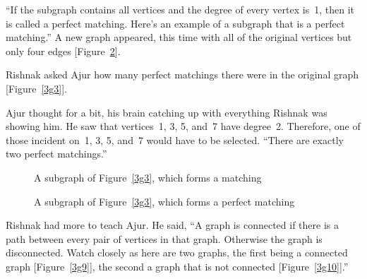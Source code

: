 ``If the subgraph contains all vertices and the degree of every vertex is~1, then it is called a perfect matching. Here's an example of a subgraph that is a perfect matching.'' A new graph appeared, this time with all of the original vertices but only four edges [Figure~\ref{3g8}].

Rishnak asked Ajur how many perfect matchings there were in the original graph [Figure~\ref{3g3}].

Ajur thought for a bit, his brain catching up with everything Rishnak was showing him. He saw that vertices~1, 3, 5, and~7 have degree~2. Therefore, one of those incident on~1, 3, 5, and~7 would have to be selected. ``There are exactly two perfect matchings.''

\begin{figure}
\begin{center}
\caption{A subgraph of Figure~\ref{3g3}, which forms a matching}\label{3g7}
\end{center}
\end{figure}

\begin{figure}
\begin{center}
\caption{A subgraph of Figure~\ref{3g3}, which forms a perfect matching}\label{3g8}
\end{center}
\end{figure}

Rishnak had more to teach Ajur.  He said, ``A graph is connected if there is a path between every pair of vertices in that graph. Otherwise the graph is disconnected. Watch closely as here are two graphs, the first being a connected graph [Figure~\ref{3g9}], the second a graph that is not connected [Figure~\ref{3g10}].''

